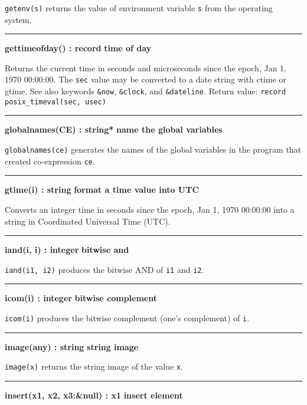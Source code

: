 \noindent
\texttt{getenv(s)} returns the value of
environment variable \texttt{s}
from the operating system.

\bigskip\hrule\vspace{0.1cm}
\noindent
{\bf gettimeofday() : record } \hfill {\bf time of day}

\noindent
{}Returns the current time in seconds and microseconds
since the epoch, Jan 1, 1970 00:00:00. The \texttt{sec} value may be
converted to a date string with ctime or gtime. See also keywords
\texttt{\&now}, \texttt{\&clock}, and \texttt{\&dateline}. Return
value: \texttt{record posix\_timeval(sec, usec)} 

\bigskip\hrule\vspace{0.1cm}
\noindent
{\bf globalnames(CE) : string* } \hfill {\bf name the global variables}

\noindent
{}\texttt{globalnames(ce)} generates the names of the global
variables in the program that created co-expression \texttt{ce}.

\bigskip\hrule\vspace{0.1cm}
\noindent
{\bf gtime(i) : string } \hfill {\bf format a time value into UTC }

\noindent
Converts an integer time in seconds since the epoch, Jan 1, 1970
00:00:00 into a string in Coordinated Universal Time (UTC). 

\bigskip\hrule\vspace{0.1cm}
\noindent
{\bf iand(i, i) : integer } \hfill {\bf bitwise and}

\noindent
{}\texttt{iand(i1, i2)} produces the bitwise AND of
\texttt{i1} and \texttt{i2}.

\bigskip\hrule\vspace{0.1cm}
\noindent
{\bf icom(i) : integer } \hfill {\bf bitwise complement}

\noindent
\texttt{icom(i)} produces the bitwise complement (one's
complement) of \texttt{i}.

\bigskip\hrule\vspace{0.1cm}
\noindent
{\bf image(any) : string } \hfill {\bf string image}

\noindent
{}\texttt{image(x)} returns the string image of the value
\texttt{x}.

\bigskip\hrule\vspace{0.1cm}
\noindent
{\bf insert(x1, x2, x3:\&null) : x1 } \hfill {\bf insert element}\WarningNotThreadSafe

